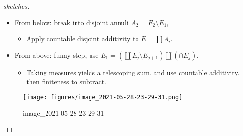 \begin{proof}[sketches]

\envlist

\begin{itemize}
\tightlist
\item
  From below: break into disjoint annuli
  \(A_{2} = E_{2}\setminus E_{1}\),

  \begin{itemize}
  \tightlist
  \item
    Apply countable disjoint additivity to
    \(E = {\textstyle\coprod}A_{i}\).
  \end{itemize}
\item
  From above: funny step, use
  \(E_{1} = ({\textstyle\coprod}E_{j}\setminus E_{j+1}) {\textstyle\coprod}(\cap E_{j})\).

  \begin{itemize}
  \tightlist
  \item
    Taking measures yields a telescoping sum, and use countable
    additivity, then finiteness to subtract.
  \end{itemize}
\end{itemize}

\begin{figure}
\centering
\texttt{[image: figures/image\_2021-05-28-23-29-31.png]}
\caption{image\_2021-05-28-23-29-31}
\end{figure}

\end{proof}

